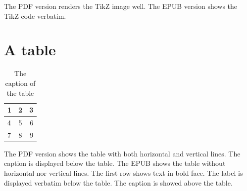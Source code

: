 \documentclass[ebook,12pt,oneside,openany]{memoir}
\begin{document}
The PDF version renders the TikZ image well.
The EPUB version shows the TikZ code verbatim.

\section{A table}

\begin{table}[H]
  \begin{tabular}{ | l || c | r | }
    \hline                       
    1 & 2 & 3 \\
    \hline                       
    \hline                       
    4 & 5 & 6 \\
    7 & 8 & 9 \\
    \hline  
  \end{tabular}
  \label{tbl:my_table}
  \caption{The caption of the table}
\end{table}

The PDF version shows the table with both horizontal and vertical lines. The caption is displayed below the table.
The EPUB shows the table without horizontal nor vertical lines. The first row shows text in bold face. The label is displayed verbatim below the table. The caption is showed above the table.



\end{document}
